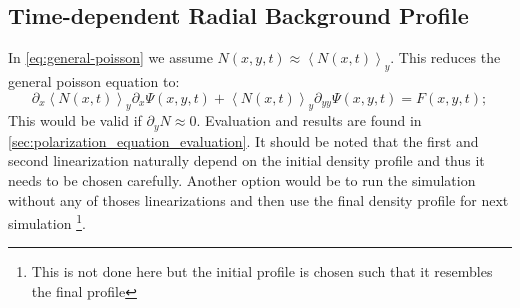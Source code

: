 \documentclass[master.tex]{subfiles}
\begin{document}
\subsection{Time-dependent Radial Background Profile}
In \autoref{eq:general-poisson} we assume $N(x,y,t) \approx \left<N(x,t)\right>_y$. This reduces the general poisson equation to:
\begin{equation}
    \partial_x \left<N(x,t)\right>_y \partial_x \Psi(x,y,t) + \left<N(x,t)\right>_y \partial_{yy} \Psi(x,y,t) = F(x,y,t);
\end{equation}
This would be valid if $\partial_y N \approx 0$.
\newline
Evaluation and results are found in \autoref{sec:polarization_equation_evaluation}. It should be noted that the first and second linearization naturally depend on the initial density profile and thus it needs to be chosen carefully. Another option would be to run the simulation without any of thoses linearizations and then use the final density profile for next simulation \footnote{This is not done here but the initial profile is chosen such that it resembles the final profile}.
\end{document}
